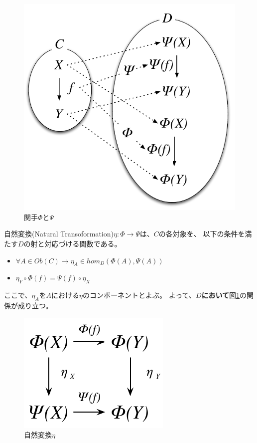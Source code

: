 \documentclass{jsarticle}
\begin{document}
\begin{figure}[htbp]
    \centering
    \includegraphics{diag_nt.pdf}
    \caption{関手$\Phi$と$\Psi$}
\end{figure}

自然変換(Natural Transoformation)$\eta:\Phi\to\Psi$は、$C$の各対象を、
以下の条件を満たす$D$の射と対応づける関数である。
\begin{itemize}
    \item $\forall A\in Ob(C)\to \eta_A\in hom_D(\Phi(A),\Psi(A))$
    \item $\eta_Y\circ \Phi(f)=\Psi(f)\circ\eta_X$
\end{itemize}
ここで、$\eta_A$を$A$における$\eta$のコンポーネントとよぶ。
よって、\textbf{$D$において}図\ref{figNatTrans}の関係が成り立つ。

\newpage

\begin{figure}[htbp]
    \centering
    \includegraphics{diag_nt2.pdf}
    \caption{自然変換$\eta$}
    \label{figNatTrans}
\end{figure}
\end{document}
